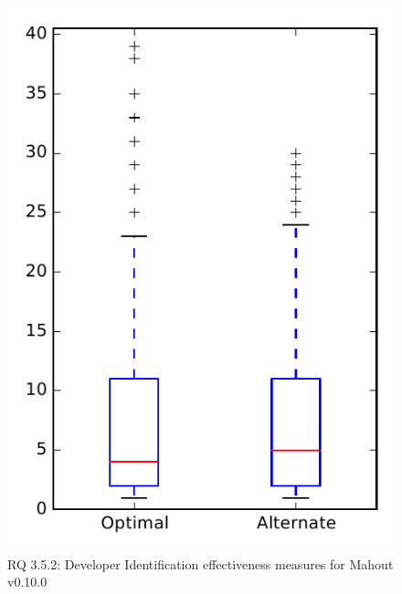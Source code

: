 
\begin{figure}
\centering
\includegraphics[height=0.4\textheight]{figures/combo/dit_rq2_mahout}
\caption{RQ 3.5.2: Developer Identification effectiveness measures for Mahout v0.10.0}
\label{fig:dit:rq2:mahout}
\end{figure}

